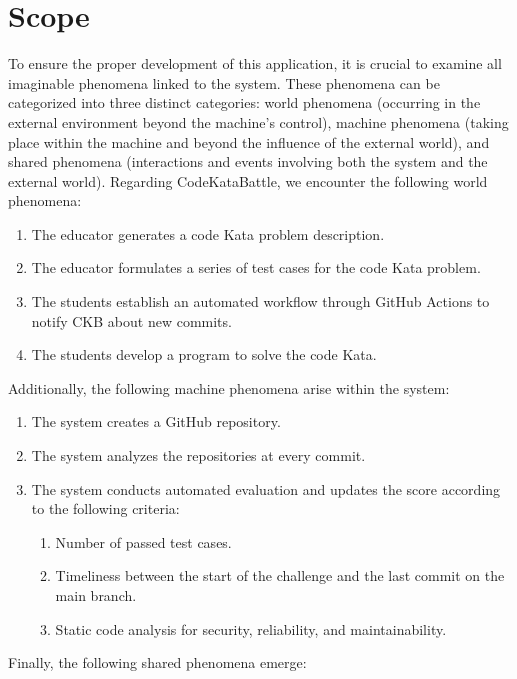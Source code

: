 \documentclass[12pt, a4paper]{report}
\begin{document}
    \section{Scope}
    To ensure the proper development of this application, it is crucial to examine all imaginable phenomena linked to the system.
    These phenomena can be categorized into three distinct categories: world phenomena (occurring in the external environment beyond the machine's control), machine phenomena (taking place within the machine and beyond the influence of the external world), and shared phenomena (interactions and events involving both the system and the external world).
    Regarding CodeKataBattle, we encounter the following world phenomena: 
    \begin{enumerate}
        \item The educator generates a code Kata problem description.
        \item The educator formulates a series of test cases for the code Kata problem.
        \item The students establish an automated workflow through GitHub Actions to notify CKB about new commits.
        \item The students develop a program to solve the code Kata.
    \end{enumerate}
    Additionally, the following machine phenomena arise within the system: 
    \begin{enumerate}
        \item The system creates a GitHub repository.
        \item The system analyzes the repositories at every commit.
        \item The system conducts automated evaluation and updates the score according to the following criteria:
            \begin{enumerate}
                \item Number of passed test cases.
                \item Timeliness between the start of the challenge and the last commit on the main branch.
                \item Static code analysis for security, reliability, and maintainability.
            \end{enumerate}
    \end{enumerate}    
    Finally, the following shared phenomena emerge:
\end{document}
